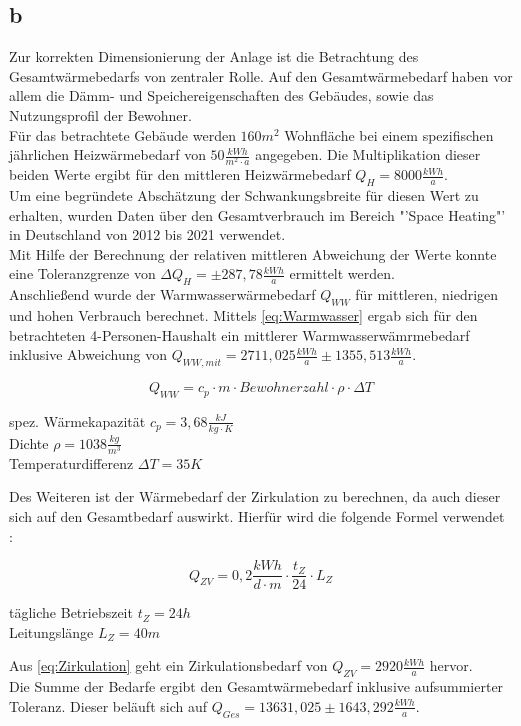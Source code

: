 \subsection{b}
Zur korrekten Dimensionierung der Anlage ist die Betrachtung des Gesamtwärmebedarfs von zentraler Rolle.
Auf den Gesamtwärmebedarf haben vor allem die Dämm- und Speichereigenschaften des Gebäudes, sowie das Nutzungsprofil der Bewohner.\\
Für das betrachtete Gebäude werden $160 m^2$ Wohnfläche bei einem spezifischen jährlichen Heizwärmebedarf von $50 \frac{kWh}{m^2 \cdot a}$ angegeben.
Die Multiplikation dieser beiden Werte ergibt für den mittleren Heizwärmebedarf $Q_H = 8000 \frac{kWh}{a}$.\\
Um eine begründete Abschätzung der Schwankungsbreite für diesen Wert zu erhalten, wurden Daten über den Gesamtverbrauch im Bereich "'Space Heating"' in Deutschland von 2012 bis 2021 verwendet.\cite{EuroStat}\\
Mit Hilfe der Berechnung der relativen mittleren Abweichung der Werte konnte eine Toleranzgrenze von $\Delta Q_H = \pm 287,78 \frac{kWh}{a}$ ermittelt werden.\\
Anschließend wurde der Warmwasserwärmebedarf $Q_{WW}$ für mittleren, niedrigen und hohen Verbrauch \cite[S.119]{Sick22} berechnet.
Mittels \autoref{eq:Warmwasser} ergab sich für den betrachteten 4-Personen-Haushalt ein mittlerer Warmwasserwämrmebedarf inklusive Abweichung von $Q_{WW,mit} = 2711,025 \frac{kWh}{a} \pm 1355,513 \frac{kWh}{a}$.

\begin{equation}
    Q_{WW}= c_p \cdot m \cdot Bewohnerzahl \cdot \rho \cdot \Delta T
    \label{eq:Warmwasser}
\end{equation}
\vspace{\baselineskip}
\begin{center}
    spez. Wärmekapazität $c_p = 3,68 \frac{kJ}{kg \cdot K}$\\
    Dichte $\rho = 1038 \frac{kg}{m^3}$\\
    Temperaturdifferenz $\Delta T = 35 K$ 
\end{center}

Des Weiteren ist der Wärmebedarf der Zirkulation zu berechnen, da auch dieser sich auf den Gesamtbedarf auswirkt.
Hierfür wird die folgende Formel verwendet \cite[S.73]{Sick22}:

\begin{equation}
    Q_{ZV} = 0,2 \frac{kWh}{d \cdot m} \cdot \frac{t_Z}{24} \cdot L_Z
    \label{eq:Zirkulation}
\end{equation}
\begin{center}
    tägliche Betriebszeit $t_Z = 24 h$\\
    Leitungslänge $L_Z = 40 m$
\end{center}
\vspace{\baselineskip}
Aus \autoref{eq:Zirkulation} geht ein Zirkulationsbedarf von $Q_{ZV} = 2920 \frac{kWh}{a}$ hervor.\\
Die Summe der Bedarfe ergibt den Gesamtwärmebedarf inklusive aufsummierter Toleranz.
Dieser beläuft sich auf $Q_{Ges}=13631,025 \pm 1643,292 \frac{kWh}{a}$.\\